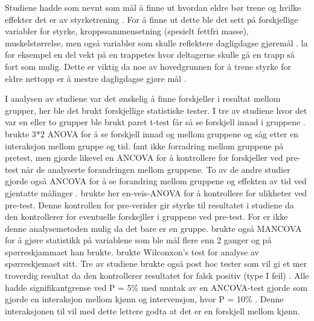 \documentclass[
]{book}
\begin{document}
Studiene hadde som nevnt som mål å finne ut hvordan eldre bør trene og hvilke effekter det er av styrketrening \citep{geirsdottir2012, schott2019, turpela2017, vikberg2019, vincent2002}. For å finne ut dette ble det sett på forskjellige variabler for styrke, kroppssammensetning (spesielt fettfri masse), muskelstørrelse, men også variabler som skulle reflektere dagligdagse gjøremål \citep{geirsdottir2012, schott2019, turpela2017, vikberg2019, vincent2002}. \citet{vincent2002} la for eksempel en del vekt på en trappetes hvor deltagerne skulle gå en trapp så fort som mulig. Dette er viktig da noe av hovedgrunnen for å trene styrke for eldre nettopp er å mestre dagligdagse gjøre mål \citep{vincent2002}.

I analysen av studiene var det ønskelig å finne forskjeller i resultat mellom grupper, her ble det brukt forskjellige statistiske tester. I tre av studiene hvor det var en eller to grupper ble brukt paret t-test får så se forskjell innad i gruppene \citep{geirsdottir2012, vikberg2019, schott2019}. \citet{vincent2002} brukte 3*2 ANOVA for å se forskjell innad og mellom gruppene og såg etter en interaksjon mellom gruppe og tid. \citet{vincent2002} fant ikke forradring mellom gruppene på pretest, men gjorde likevel en ANCOVA for å kontrollere for forskjeller ved pre-test når de analyserte forandringen mellom gruppene. To av de andre studier gjorde også ANCOVA for å se forandring mellom gruppene og effekten av tid ved gjentatte målinger \citep{schott2019, vikberg2019}. \citet{turpela2017} brukte her en-veis-ANOVA for å kontrollere for ulikheter ved pre-test. Denne kontrollen for pre-verider gir styrke til resultatet i studiene da den kontrollerer for eventuelle forskejller i gruppene ved pre-test. For \citet{geirsdottir2012} er ikke denne analysemetoden mulig da det bare er en gruppe. \citet{schott2019} brukte også MANCOVA for å gjøre statistikk på variablene som ble mål flere enn 2 ganger og på spørreskjammaet han brukte. \citet{geirsdottir2012} brukte Wilconxon's test for analyse av spørreskjemaet sitt. Tre av studiene brukte også post hoc tester som vil gi et mer troverdig resultat da den kontrollerer resultatet for falsk positiv (type I feil) \citep[s. 50-52]{hulley2013}\citep{schott2019, turpela2017, vincent2002}. Alle hadde signifikantgrense ved P = 5\% med unntak av en ANCOVA-test \citet{vikberg2019} gjorde som gjorde en interaksjon mellom kjønn og intervensjon, hvor P = 10\% \citep{geirsdottir2012, schott2019, turpela2017, vincent2002}. Denne interaksjonen til \citet{vikberg2019} vil med dette lettere godta at det er en forskjell mellom kjønn.
\end{document}

